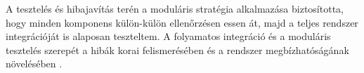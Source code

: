 A tesztelés és hibajavítás terén a moduláris stratégia alkalmazása biztosította, 
hogy minden komponens külön-külön ellenőrzésen essen át, majd a teljes rendszer integrációját is alaposan teszteltem. 
A folyamatos integráció és a moduláris tesztelés szerepét 
a hibák korai felismerésében és a rendszer megbízhatóságának növelésében \cite{Szalay2018,Kaposi2019}. 
\begin{comment}
\section{Tanulságok a kockázatkezelésből}

A projekt során szerzett tapasztalatok egyértelműen alátámasztották, hogy a kockázatok előrejelzése 
és kezelése alapvető fontosságú az önálló fejlesztések sikeréhez.  
Az előzetesen kialakított kockázatmátrix biztosította a legkritikusabb problémák azonosítását, 
így a figyelmet a rendszer stabilitását leginkább veszélyeztető területekre tudtam összpontosítani, 
miközben a kisebb kockázatok kezelését későbbre halaszthattam.  

A rendszeres tesztelés és részletes dokumentáció elősegítette a hibák gyors felismerését és 
javítását, növelte a fejlesztés átláthatóságát, valamint támogatta a későbbi bővítések gördülékeny megvalósítását.  
A moduláris tesztelési stratégia és az iteratív javítások kombinációja biztosította, hogy a 
rendszer megbízhatóan működjön, miközben a fejlesztési folyamat hatékonyan szervezett maradt.

Az időmenedzsment és a feladatpriorizálás kulcsfontosságú tényezőnek bizonyult a projekt folyamatos előrehaladásában.  
A napi és heti ütemtervek, valamint a rangsorolt feladatlista lehetővé tették, hogy a projekt 
haladása ne veszélyeztesse a munkavégzés minőségét és a határidők betartását.  
A strukturált időbeosztás és a fókuszált munkavégzés döntő jelentőségű a sikeres, önálló fejlesztéshez.
\end{comment}